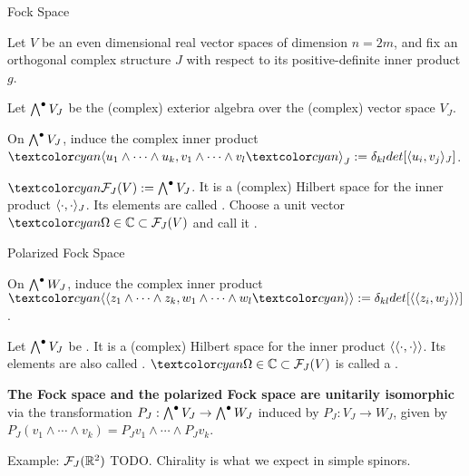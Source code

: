 \begin{frame}{Fock Space} %

    Let $V$ be an even dimensional real vector spaces of dimension $n = 2m$, and fix an orthogonal complex structure $J$ with respect to its positive-definite inner product $g$.
    
    Let $\bigwedge^\bullet V_J$ be the (complex) exterior algebra over the (complex) vector space $V_J$.
    
    On $\bigwedge^\bullet V_J$, induce the complex inner product $\defn{\bra} u_1 \wedge \cdots \wedge u_k, v_1 \wedge \cdots \wedge v_l \defn{\ket}_J := \delta_{kl} det[\bra u_i, v_j \ket_J]$.
    
    \begin{definition}
     $\defn{\mathcal F_J(V)} := \extv_J$. It is a (complex) Hilbert space for the inner product $\langle \cdot, \cdot \rangle_J$. Its elements are called . Choose a unit vector $\defn{\Omega} \in \CC \subset \fjv$ and call it .
    \end{definition}

\end{frame}

\begin{frame}{Polarized Fock Space} %

    On $\bigwedge^\bullet W_J$, induce the complex inner product $\defn{\bbra} z_1 \wedge \cdots \wedge z_k, w_1 \wedge \cdots \wedge w_l \defn{\kket} := \delta_{kl} det[\bbra z_i, w_j \kket]$.
    
    \begin{definition}
    Let $\bigwedge^\bullet V_J$ be . It is a (complex) Hilbert space for the inner product $\langle\langle \cdot, \cdot \rangle\rangle$. Its elements are also called . $\defn{\Omega} \in \CC \subset \fjv$ is called a .
    \end{definition}
    
    \textbf{The Fock space and the polarized Fock space are unitarily isomorphic} via the transformation $P_J : \bigwedge^\bullet V_J \to \bigwedge^\bullet W_J$ induced by $P_J:V_J \to W_J$, given by $P_J(v_1 \wedge \cdots \wedge v_k) = P_Jv_1 \wedge \cdots \wedge P_Jv_k$.
    
\end{frame}

\begin{frame}{Example: $\mathcal F_J(\mathbb R^2)$} %
    TODO. Chirality is what we expect in simple spinors.
    
\end{frame}

